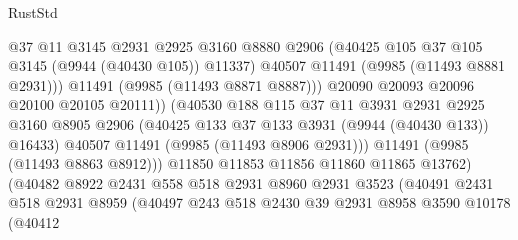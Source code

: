 \begin{lexlean}{RustStd}
\begin{coremodule}
                                    @37
                                    @11
                                    @3145
                                    @2931
                                    @2925
                                    @3160
                                    @8880
                                    @2906
                                    (@40425 @105 @37 @105 @3145 (@9944 (@40430 @105)) @11337)
                                    @40507
                                    @11491
                                    (@9985 (@11493 @8881 @2931)))
                                  @11491
                                  (@9985 (@11493 @8871 @8887)))
                                @20090
                                @20093
                                @20096
                                @20100
                                @20105
                                @20111))
                            (@40530
                              @188
                              @115
                              @37
                              @11
                              @3931
                              @2931
                              @2925
                              @3160
                              @8905
                              @2906
                              (@40425 @133 @37 @133 @3931 (@9944 (@40430 @133)) @16433)
                              @40507
                              @11491
                              (@9985 (@11493 @8906 @2931)))
                            @11491
                            (@9985 (@11493 @8863 @8912)))
                          @11850
                          @11853
                          @11856
                          @11860
                          @11865
                          @13762)
                        (@40482
                          @8922
                          @2431
                          @558
                          @518
                          @2931
                          @8960
                          @2931
                          @3523
                          (@40491
                            @2431
                            @518
                            @2931
                            @8959
                            (@40497
                              @243
                              @518
                              @2430
                              @39
                              @2931
                              @8958
                              @3590
                              @10178
                              (@40412

\end{coremodule}
\end{lexlean}

